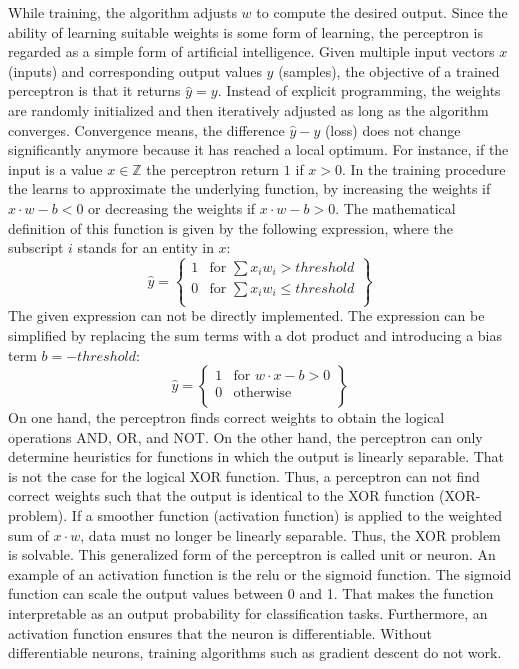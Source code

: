 \noindent While training, the algorithm adjusts \(w\) to compute the desired output. Since the ability of learning suitable weights is some form of learning, the perceptron is regarded as a simple form of artificial intelligence. Given multiple input vectors \(x\) (inputs) and corresponding output values \(y\) (samples), the objective of a trained perceptron is that it returns \(\hat{y} = y\). Instead of explicit programming, the weights are randomly initialized and then iteratively adjusted as long as the algorithm converges. Convergence means, the difference \(\hat{y} - y\) (loss) does not change significantly anymore because it has reached a local optimum. For instance, if the input is a value \(x \in \mathbb{Z}\) the perceptron return \(1\) if \(x > 0\). In the training procedure the learns to approximate the underlying function, by increasing the weights if  \(x \cdot w - b < 0 \) or decreasing the weights if \(x \cdot w - b > 0 \). The mathematical definition of this function is given by the following expression, where the subscript \(i\) stands for an entity in \(x\):
%
\begin{equation}
	\hat{y} = \left\{\begin{array}{lr}
		1 & \text{for } \sum x_i w_i > threshold\\
		0 & \text{for } \sum x_i w_i \le threshold\\
	\end{array}\right\}
\end{equation}
%
\noindent The given expression can not be directly implemented. The expression can be simplified by replacing the sum terms with a dot product and introducing a bias term \(b= - threshold\): 
%
\begin{equation}
	\hat{y} = \left\{\begin{array}{lr}
		1 & \text{for } w \cdot x - b > 0\\
		0 & \text{otherwise}\\
	\end{array}\right\}
\end{equation}
%
\noindent On one hand, the perceptron finds correct weights to obtain the logical operations AND, OR, and NOT. On the other hand, the perceptron can only determine heuristics for functions in which the output is linearly separable. That is not the case for the logical XOR function. Thus, a perceptron can not find correct weights such that the output is identical to the XOR function (XOR-problem). If a smoother function (activation function) is applied to the weighted sum of \(x \cdot w\), data must no longer be linearly separable. Thus, the XOR problem is solvable. This generalized form of the perceptron is called unit or neuron. An example of an activation function is the \ac{relu} or the sigmoid function. The sigmoid function can scale the output values between 0 and 1. That makes the function interpretable as an output probability for classification tasks. Furthermore, an activation function ensures that the neuron is differentiable. Without differentiable neurons, training algorithms such as gradient descent do not work.  
%
